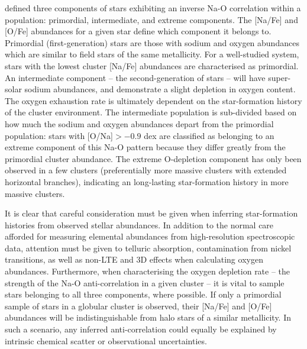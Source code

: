 \documentclass{emulateapj}
\begin{document}
\citet{carretta;et-al_2009_na_o} defined three components of stars exhibiting an inverse Na-O correlation within a population: primordial, intermediate, and extreme components. The [Na/Fe] and [O/Fe] abundances for a given star define which component it belongs to. Primordial (first-generation) stars are those with sodium and oxygen abundances which are similar to field stars of the same metallicity. For a well-studied system, stars with the lowest cluster [Na/Fe] abundances are characterised as primordial. An intermediate component \--- the second-generation of stars \--- will have super-solar sodium abundances, and demonstrate a slight depletion in oxygen content. The oxygen exhaustion rate is ultimately dependent on the star-formation history of the cluster environment. The intermediate population is sub-divided based on how much the sodium and oxygen abundances depart from the primordial population: stars with [O/Na]$ > -0.9$ dex are classified as belonging to an extreme component of this Na-O pattern because they differ greatly from the primordial cluster abundance. The extreme O-depletion component has only been observed in a few clusters (preferentially more massive clusters with extended horizontal branches), indicating an long-lasting star-formation history in more massive clusters.

It is clear that careful consideration must be given when inferring star-formation histories from observed stellar abundances. In addition to the normal care afforded for measuring elemental abundances from high-resolution spectroscopic data, attention must be given to telluric absorption, contamination from nickel transitions, as well as non-LTE and 3D effects when calculating oxygen abundances. Furthermore, when characterising the oxygen depletion rate \--- the strength of the Na-O anti-correlation in a given cluster \--- it is vital to sample stars belonging to all three components, where possible. If only a primordial sample of stars in a globular cluster is observed, their [Na/Fe] and [O/Fe] abundances will be indistinguishable from halo stars of a similar metallicity. In such a scenario, any inferred anti-correlation could equally be explained by intrinsic chemical scatter or observational uncertainties.
\end{document}

